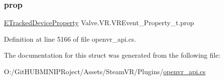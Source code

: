 \mbox{\label{struct_valve_1_1_v_r_1_1_v_r_event___property__t_ad72d79db99053b3f4ae7146f40e32f2f}} 
\subsubsection{\texorpdfstring{prop}{prop}}
{\footnotesize\ttfamily \mbox{\hyperlink{namespace_valve_1_1_v_r_ab060521ead7273986988fc4897e52482}{E\+Tracked\+Device\+Property}} Valve.\+V\+R.\+V\+R\+Event\+\_\+\+Property\+\_\+t.\+prop}



Definition at line 5166 of file openvr\+\_\+api.\+cs.



The documentation for this struct was generated from the following file\+:\begin{DoxyCompactItemize}
\item 
O\+:/\+Git\+H\+U\+B\+M\+I\+N\+I\+P\+Roject/\+Assets/\+Steam\+V\+R/\+Plugins/\mbox{\hyperlink{openvr__api_8cs}{openvr\+\_\+api.\+cs}}\end{DoxyCompactItemize}

